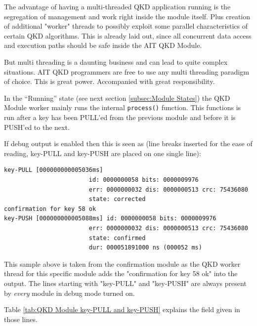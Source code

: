 The advantage of having a multi-threaded QKD application running is the segregation of management and work right inside the module itself. Plus creation of additional "worker" threads to possibly exploit some parallel characteristics of certain QKD algorithms. This is already laid out, since all concurrent data access and execution paths should be safe inside the AIT QKD Module.

\medskip

But multi threading is a daunting business and can lead to quite complex situations. AIT QKD programmers are free to use any multi threading paradigm of choice. This is great power. Accompanied with great responsibility.

\medskip

In the ``Running'' state (see next section \ref{subsec:Module States}) the QKD Module worker mainly runs the internal \texttt{process()} function. This functions is run after a key has been PULL'ed from the previous module and before it is PUSH'ed to the next.

\medskip

If debug output is enabled then this is seen as (line breaks inserted for the ease of reading, key-PULL and key-PUSH are placed on one single line):

\begin{minipage}{0.9\textwidth}
\bigskip
\begin{verbatim}
key-PULL [000000000005036ms] 
                        id: 0000000058 bits: 0000009976 
                        err: 0000000032 dis: 0000000513 crc: 75436080 
                        state: corrected
confirmation for key 58 ok
key-PUSH [000000000005088ms] id: 0000000058 bits: 0000009976 
                        err: 0000000032 dis: 0000000513 crc: 75436080 
                        state: confirmed
                        dur: 000051891000 ns (000052 ms)
\end{verbatim}
\medskip
\end{minipage}

This sample above is taken from the confirmation module as the QKD worker thread for this specific module adds the "confirmation for key 58 ok" into the output. The lines starting with "key-PULL" and "key-PUSH" are always present by \emph{every} module in debug mode turned on.

\medskip

Table \ref{tab:QKD Module key-PULL and key-PUSH} explains the field given in those lines.

